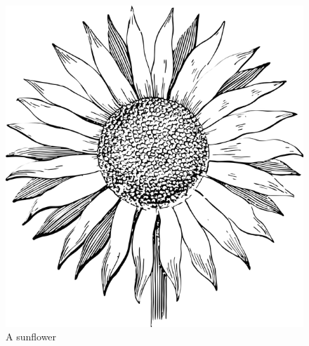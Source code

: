 \documentclass[
]{interact}
\begin{document}
\begin{figure}

{\centering \includegraphics{sunflower.png}

}

\caption{\label{fig-sunflower}A sunflower}

\end{figure}
\end{document}
